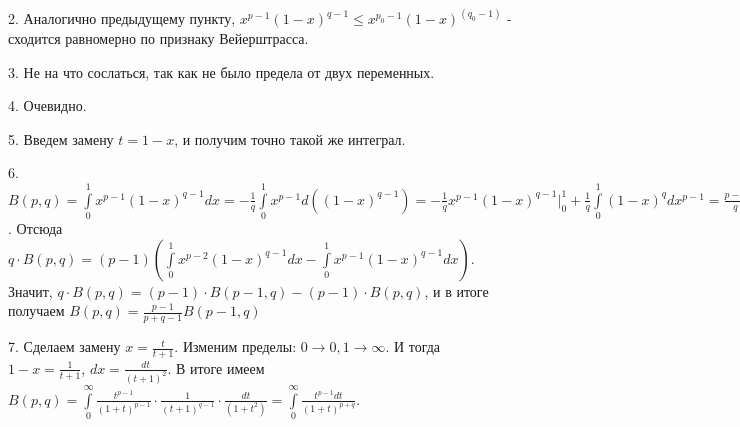 2. Аналогично предыдущему пункту,
$x^{p-1}(1-x)^{q-1}\leqslant x^{p_0-1}(1-x)^(q_0-1)$ - 
сходится равномерно по признаку Вейерштрасса.

3. Не на что сослаться, так как не было предела от двух переменных.

4. Очевидно.

5. Введем замену $t=1-x$, и получим точно такой же интеграл. 

6.  $B(p,q)=\int\limits_{0}^{1}x^{p-1}(1-x)^{q-1}dx=
-\frac{1}{q}\int\limits_{0}^{1}x^{p-1}d((1-x)^{q-1})=
-\frac{1}{q}x^{p-1}(1-x)^{q-1}\big|^1_0+\frac{1}{q}\int\limits_{0}^{1}
(1-x)^{q}dx^{p-1}=\frac{p-1}{q}\int\limits_{0}^{1}x^{p-2}(1-x)^{q-1}(1-x)dx$.
Отсюда $q\cdot B(p,q)=(p-1)\left(
 \int\limits_{0}^{1}x^{p-2}(1-x)^{q-1}dx-
\int\limits_{0}^{1}x^{p-1}(1-x)^{q-1}dx\right)$. Значит,
$q\cdot B(p,q)=(p-1)\cdot B(p-1,q)-(p-1)\cdot B(p,q)$, и в итоге получаем
$B(p,q)=\frac{p-1}{p+q-1}B(p-1,q)$

7. Сделаем замену $x=\frac{t}{t+1}$. Изменим пределы: 
$0\to 0,1\to \infty$. И тогда $1-x=\frac{1}{t+1}$, $dx=\frac{dt}{(t+1)^2}$.
В итоге имеем $B(p,q)=\int\limits_{0}^{\infty} \frac{t^{p-1}}{(1+t)^{p-1}}
\cdot \frac{1}{(t+1)^{q-1}}\cdot \frac{dt}{(1+t^2)}=
\int\limits_{0}^{\infty} \frac{t^{p-1}dt}{(1+t)^{p+q}}$. 

